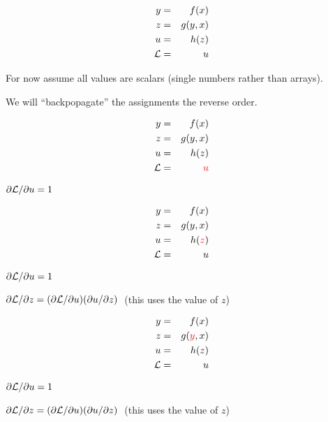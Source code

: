 {
\vspace{-3ex}
\begin{eqnarray*}
  y & = & f(x) \\
  z & = & g(y,x) \\
  u & = & h(z) \\
  {\cal L} & = & u
\end{eqnarray*}

\medskip
For now assume all values are scalars (single numbers rather than arrays).

\medskip
We will ``backpopagate'' the assignments the reverse order.

\vspace{-3ex}
\begin{eqnarray*}
  y & = & f(x) \\
  z & = & g(y,x) \\
  u & = & h(z) \\
  {\cal L} &  = & {\color{red} u}
\end{eqnarray*}

\medskip
{\color{red} ${\partial {\cal L}}/{\partial u} = 1$}

\vspace{-3ex}
\begin{eqnarray*}
  y & = & f(x) \\
  z & = & g(y,x) \\
  u & = & h({\color{red} z}) \\
  {\cal L} &  = &  u
\end{eqnarray*}

\medskip
${\partial {\cal L}}/{\partial u} = 1$

\medskip
{\color{red} ${\partial {\cal L}}/{\partial z} = ({\partial {\cal L}}/{\partial u}) ({\partial u}/{\partial z})\;$} (this uses the value of $z$)

\vspace{-3ex}
\begin{eqnarray*}
  y & = & f(x) \\
  z & = & g({\color{red} y},x) \\
  u & = & h(z) \\
  {\cal L} &  = &  u
\end{eqnarray*}

\medskip
${\partial {\cal L}}/{\partial u} = 1$

\medskip
{\color{red} ${\partial {\cal L}}/{\partial z} = ({\partial {\cal L}}/{\partial u}) ({\partial u}/{\partial z})\;$} (this uses the value of $z$)

}
